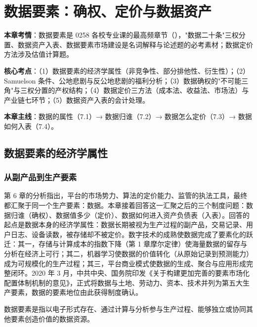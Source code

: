\chapter{数据要素：确权、定价与数据资产}

\begin{examguide}
\textbf{本章考情}：数据要素是 0258 各校专业课的最高频章节（），"数据二十条"三权分置、数据资产入表、数据要素市场建设是名词解释与论述题的必考素材；数据定价方法涉及估值计算题。

\textbf{核心考点}：（1）数据要素的经济学属性（非竞争性、部分排他性、衍生性）；（2）Samuelson 条件、公地悲剧与反公地悲剧的福利分析；（3）数据确权的"不可能三角"与三权分置的产权结构；（4）数据定价三方法（成本法、收益法、市场法）与产业链七环节；（5）数据资产入表的会计处理。

\textbf{本章主线}：数据的属性（7.1）→ 数据归谁（7.2）→ 数据怎么定价（7.3）→ 数据如何入表（7.4）。
\end{examguide}

\section{数据要素的经济学属性}

\subsection{从副产品到生产要素}

第 6 章的分析指出，平台的市场势力、算法的定价能力、监管的执法工具，最终都汇聚于同一个生产要素：数据。本章接着回答这一汇聚之后的三个制度问题：数据归谁（确权）、数据值多少（定价）、数据如何进入资产负债表（入表）。回答的起点是数据本身的经济学属性：数据长期被视为生产过程的副产品，交易记录、用户日志、设备读数，被存储却不被定价。数字技术的成熟使数据完成了要素化的跃迁：其一，存储与计算成本的指数下降（第 1 章摩尔定律）使海量数据的留存与分析在经济上可行；其二，机器学习使数据的价值转化（从原始记录到预测能力）成为可规模化的生产过程；其三，平台商业模式使数据的生成、聚合与应用形成完整闭环。2020 年 3 月，中共中央、国务院印发《关于构建更加完善的要素市场化配置体制机制的意见》，正式将数据与土地、劳动力、资本、技术并列为第五大生产要素，数据的要素地位由此获得制度确认。

\begin{definition}
数据要素是指以电子形式存在、通过计算与分析参与生产过程、能够独立或协同其他要素创造价值的数据资源。
\end{definition}

